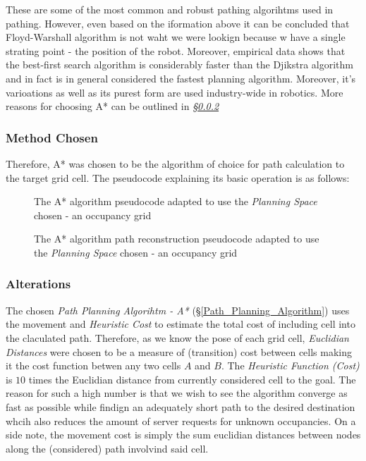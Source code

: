 \documentclass[11pt, a4paper]{article}
\begin{document}
These are some of the most common and robust pathing algorihtms used in pathing. However, even based on the iformation above it can be concluded that Floyd-Warshall algorithm is not waht we were lookign because w have a single strating point - the position of the robot. Moreover, empirical data\cite{path_efficiency} shows that the best-first search algorithm is considerably faster than the Djikstra algorithm and in fact is in general considered the fastest planning algorithm. Moreover, it's varioations as well as its purest form are used industry-wide in robotics. More reasons for choosing A* can be outlined in \textit{\S\ref{Path_Planning_Algorihtm_Alterations}}

\subsubsection{Method Chosen} 

Therefore, A* was chosen to be the algorithm of choice for path calculation to the target grid cell. The pseudocode explaining its basic operation is as follows:

\begin{figure}[H]
	  \caption{The A* algorithm pseudocode\cite{path_astar_pseudocode} adapted to use the \textit{Planning Space} chosen - an occupancy grid }
 	  \centering 
	  
\end{figure} 


\begin{figure}[H]
	  \caption{The A* algorithm path reconstruction pseudocode\cite{path_astar_grid_no_grid} adapted to use the \textit{Planning Space} chosen - an occupancy grid }
 	  \centering
          
\end{figure} 

\subsubsection{Alterations}
\label{Path_Planning_Algorihtm_Alterations}

The chosen \textit{Path Planning Algorihtm - A*} (\S\ref{Path_Planning_Algorithm}) uses the movement and \textit{Heuristic Cost} to estimate the total cost of  including cell into the claculated path. Therefore, as we know the pose of each grid cell, \textit{Euclidian Distances} were chosen to be a measure of (transition) cost between cells making it the cost function betwen any two cells $A$ and $B$. The \textit{Heuristic Function (Cost)} is $10$ times the Euclidian distance from currently considered cell to the goal. The reason for such a high number is that we wish to see the algorithm converge as fast as possible while findign an adequately short path to the desired destination whcih also reduces the amount of server requests for unknown occupancies. On a side note, the movement cost is simply the sum euclidian distances between nodes along the (considered) path involvind said cell.
\end{document}
